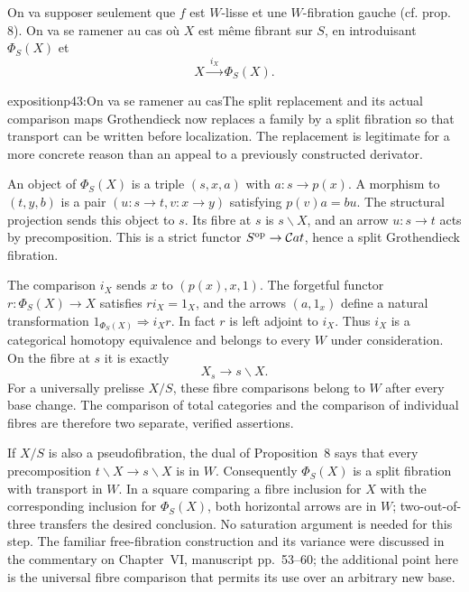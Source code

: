 On va supposer seulement que $f$ est $W$-lisse et une $W$-fibration gauche (cf. prop. 8). On va se ramener au cas où $X$ est même fibrant sur $S$, en introduisant $\Phi_S(X)$ et %
\[ X\xrightarrow{\ i_X\ }\Phi_S(X). \]

\begin{dcomment}{exposition}{p43:On va se ramener au cas}{The split replacement and its actual comparison maps}
Grothendieck now replaces a family by a split fibration so that transport can be written before localization. The replacement is legitimate for a more concrete reason than an appeal to a previously constructed derivator.

An object of $\Phi_S(X)$ is a triple $(s,x,a)$ with $a:s\to p(x)$. A morphism to $(t,y,b)$ is a pair $(u:s\to t,v:x\to y)$ satisfying $p(v)a=bu$. The structural projection sends this object to $s$. Its fibre at $s$ is $s\backslash X$, and an arrow $u:s\to t$ acts by precomposition. This is a strict functor $S^{\mathrm{op}}\to\mathcal{C}at$, hence a split Grothendieck fibration.

The comparison $i_X$ sends $x$ to $(p(x),x,1)$. The forgetful functor $r:\Phi_S(X)\to X$ satisfies $ri_X=1_X$, and the arrows $(a,1_x)$ define a natural transformation $1_{\Phi_S(X)}\Rightarrow i_Xr$. In fact $r$ is left adjoint to $i_X$. Thus $i_X$ is a categorical homotopy equivalence and belongs to every $W$ under consideration. On the fibre at $s$ it is exactly
\[
 X_s\longrightarrow s\backslash X.
\]
For a universally prelisse $X/S$, these fibre comparisons belong to $W$ after every base change. The comparison of total categories and the comparison of individual fibres are therefore two separate, verified assertions.

If $X/S$ is also a pseudofibration, the dual of Proposition~8 says that every precomposition $t\backslash X\to s\backslash X$ is in $W$. Consequently $\Phi_S(X)$ is a split fibration with transport in $W$. In a square comparing a fibre inclusion for $X$ with the corresponding inclusion for $\Phi_S(X)$, both horizontal arrows are in $W$; two-out-of-three transfers the desired conclusion. No saturation argument is needed for this step. The familiar free-fibration construction and its variance were discussed in the commentary on Chapter~VI, manuscript pp.~53--60; the additional point here is the universal fibre comparison that permits its use over an arbitrary new base.
\end{dcomment}


